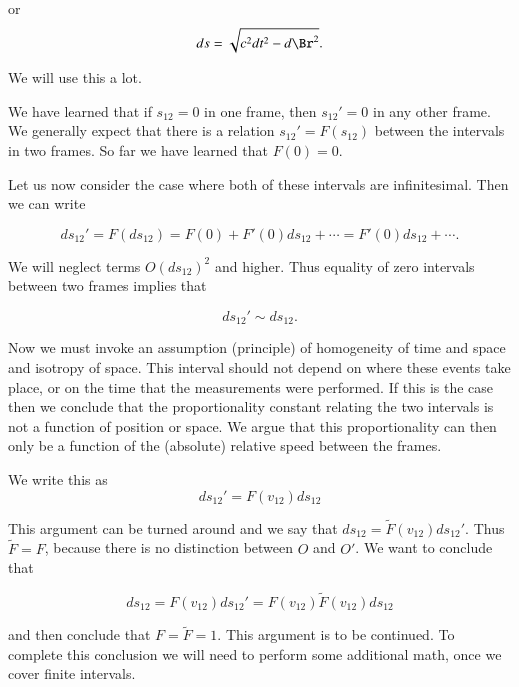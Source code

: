 or
\begin{equation}\label{eqn:relativisticElectrodynamicsL2:60b}
ds= \sqrt{c^2 dt^2 - d\Br^2}.
\end{equation}

We will use this a lot.

We have learned that if \(s_{12} = 0\) in one frame, then \(s_{12}' = 0\) in any other frame.  We generally expect that there is a relation \(s_{12}' = F(s_12)\) between the intervals in two frames.  So far we have learned that \(F(0) = 0\).

Let us now consider the case where both of these intervals are infinitesimal.  Then we can write

\begin{equation}\label{eqn:relativisticElectrodynamicsL2:70}
ds_{12}' = F(ds_{12}) = F(0) + F'(0) ds_{12} + \cdots = F'(0) ds_{12} + \cdots.
\end{equation}

We will neglect terms \(O(ds_{12})^2\) and higher.  Thus equality of zero intervals between two frames implies that

\begin{equation}\label{eqn:relativisticElectrodynamicsL2:80}
ds_{12}' \sim ds_{12}.
\end{equation}

Now we must invoke an assumption (principle) of homogeneity of time and space and isotropy of space.  This interval should not depend on where these events take place, or on the time that the measurements were performed.  If this is the case then we conclude that the proportionality constant relating the two intervals is not a function of position or space.  We argue that this proportionality can then only be a function of the (absolute) relative speed between the frames.

We write this as
\begin{equation}\label{eqn:relativisticElectrodynamicsL2:90}
ds_{12}' = F(v_{12}) ds_{12}
\end{equation}

This argument can be turned around and we say that \(ds_{12} = \tilde{F}(v_{12}) ds_{12}'\).  Thus \(\tilde{F} = F\), because there is no distinction between \(O\) and \(O'\).  We want to conclude that

\begin{equation}\label{eqn:relativisticElectrodynamicsL2:100}
ds_{12} = F(v_{12}) ds_{12}' = F(v_{12}) \tilde{F}(v_{12}) ds_{12}
\end{equation}

and then conclude that \(F = \tilde{F} = 1\).  This argument is to be continued.  To complete this conclusion we will need to perform some additional math, once we cover finite intervals.
